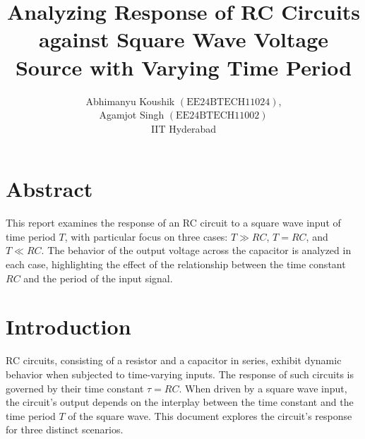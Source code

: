 \documentclass[12pt]{article}
\newcommand{\brak}[1]{\ensuremath{\left(#1\right)}}
\begin{document}
\title{Analyzing Response of RC Circuits against Square Wave Voltage Source with Varying Time Period}
\author{Abhimanyu Koushik \brak{\text{EE24BTECH11024}},\\Agamjot Singh \brak{\text{EE24BTECH11002}}\\IIT Hyderabad}
{\let\newpage\relax\maketitle}
\setlength{\intextsep}{10pt} %


\section*{Abstract}
This report examines the response of an RC circuit to a square wave input of time period $T$, with particular focus on three cases: $T \gg RC$, $T = RC$, and $T \ll RC$. The behavior of the output voltage across the capacitor is analyzed in each case, highlighting the effect of the relationship between the time constant $RC$ and the period of the input signal.

\section{Introduction}
RC circuits, consisting of a resistor and a capacitor in series, exhibit dynamic behavior when subjected to time-varying inputs. The response of such circuits is governed by their time constant $\tau = RC$. When driven by a square wave input, the circuit's output depends on the interplay between the time constant and the time period $T$ of the square wave. This document explores the circuit's response for three distinct scenarios.
\end{document}
